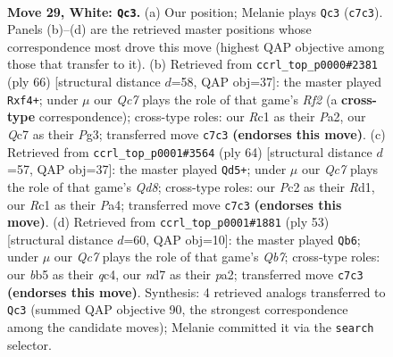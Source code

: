 \documentclass[11pt]{article}
\begin{document}
\clearpage

\begin{figure}[p]\centering
\begin{subfigure}{0.46\textwidth}\centering
\resizebox{\linewidth}{!}{%
\newchessgame
\chessboard[
  setfen={8/2Qn1k2/r7/pb1Ppp2/6p1/8/PPP2PP1/2R1K3 w - - 3 29},
  showmover=false,
  pgfstyle=straightmove, color=movearrow, markmove={c7-c3}
]}
\caption{}
\end{subfigure}\hfill
\begin{subfigure}{0.46\textwidth}\centering
\resizebox{\linewidth}{!}{%
\newchessgame
\chessboard[
  setfen={2r5/8/p4k1p/1ppP4/5b2/6P1/PPK2R1P/8 w - - 0 34},
  showmover=false,
  pgfstyle=straightmove, color=movearrow, markmove={f2-f4}
]}
\caption{}
\end{subfigure}
\\[4pt]
\begin{subfigure}{0.46\textwidth}\centering
\resizebox{\linewidth}{!}{%
\newchessgame
\chessboard[
  setfen={r1bQq3/1p3k2/8/p4p2/P7/2P4P/1P3PP1/3R2K1 w - - 3 33},
  showmover=false,
  pgfstyle=straightmove, color=movearrow, markmove={d8-d5}
]}
\caption{}
\end{subfigure}\hfill
\begin{subfigure}{0.46\textwidth}\centering
\resizebox{\linewidth}{!}{%
\newchessgame
\chessboard[
  setfen={1r4k1/5pp1/p6p/3RP3/2Q5/4P2P/Pq4P1/6K1 b - - 0 27},
  showmover=false,
  pgfstyle=straightmove, color=movearrow, markmove={b2-b6}
]}
\caption{}
\end{subfigure}
\caption{\textbf{Move 29, White: \texttt{Qc3}.} (a) Our position; Melanie plays \texttt{Qc3} (\texttt{c7c3}). Panels (b)--(d) are the retrieved master positions whose correspondence most drove this move (highest QAP objective among those that transfer to it). (b) Retrieved from \texttt{ccrl\_top\_p0000\#2381} (ply 66) [structural distance $d$=58, QAP obj=37]: the master played \texttt{Rxf4+}; under $\mu$ our \emph{Qc7} plays the role of that game's \emph{Rf2} (a \textbf{cross-type} correspondence); cross-type roles: our \emph{R}c1 as their \emph{P}a2, our \emph{Q}c7 as their \emph{P}g3; transferred move \texttt{c7c3} \textbf{(endorses this move)}. (c) Retrieved from \texttt{ccrl\_top\_p0001\#3564} (ply 64) [structural distance $d$=57, QAP obj=37]: the master played \texttt{Qd5+}; under $\mu$ our \emph{Qc7} plays the role of that game's \emph{Qd8}; cross-type roles: our \emph{P}c2 as their \emph{R}d1, our \emph{R}c1 as their \emph{P}a4; transferred move \texttt{c7c3} \textbf{(endorses this move)}. (d) Retrieved from \texttt{ccrl\_top\_p0001\#1881} (ply 53) [structural distance $d$=60, QAP obj=10]: the master played \texttt{Qb6}; under $\mu$ our \emph{Qc7} plays the role of that game's \emph{Qb7}; cross-type roles: our \emph{b}b5 as their \emph{q}c4, our \emph{n}d7 as their \emph{p}a2; transferred move \texttt{c7c3} \textbf{(endorses this move)}. Synthesis: 4 retrieved analogs transferred to \texttt{Qc3} (summed QAP objective 90, the strongest correspondence among the candidate moves); Melanie committed it via the \texttt{search} selector.}
\label{fig:thought-m56}
\end{figure}
\end{document}
